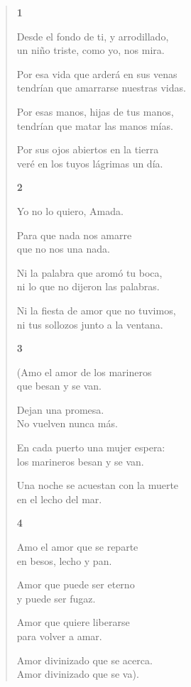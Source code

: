 \documentclass[12pt]{article}
\begin{document}
\clearpage
{}
\begin{verse}

{\bfseries\scshape {1}}

Desde el fondo de ti, y arrodillado,\\
un niño triste, como yo, nos mira.  

Por esa vida que arderá en sus venas\\
tendrían que amarrarse nuestras vidas.  

Por esas manos, hijas de tus manos,\\
tendrían que matar las manos mías.  

Por sus ojos abiertos en la tierra\\
veré en los tuyos lágrimas un día.  

{\bfseries\scshape {2}}

Yo no lo quiero, Amada.  

Para que nada nos amarre\\
que no nos una nada.  

Ni la palabra que aromó tu boca,\\
ni lo que no dijeron las palabras.  

Ni la fiesta de amor que no tuvimos,\\
ni tus sollozos junto a la ventana.  

{\bfseries\scshape {3}}

(Amo el amor de los marineros\\
que besan y se van.  

Dejan una promesa.\\
No vuelven nunca más.  

En cada puerto una mujer espera:\\
los marineros besan y se van.  

Una noche se acuestan con la muerte\\
en el lecho del mar.  

{\bfseries\scshape {4}}

Amo el amor que se reparte\\
en besos, lecho y pan.  

Amor que puede ser eterno\\
y puede ser fugaz.  

Amor que quiere liberarse\\
para volver a amar.  

Amor divinizado que se acerca.\\
Amor divinizado que se va).  


\end{verse}
\end{document}
